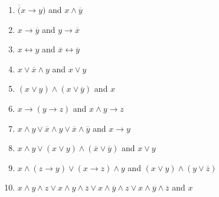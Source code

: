     \begin{enumerate}
        \item $\overline (x \rightarrow y)$ and $x \wedge \overline y$
        \item $x \rightarrow \overline y$ and $y \rightarrow \overline x$
        \item $x \leftrightarrow y$ and $\overline x \leftrightarrow \overline y$
        \item $x \vee \overline x \wedge y$ and $x \vee y$
        \item $(x \vee y) \wedge (x \vee \overline y)$ and $x$
        \item $x \rightarrow (y \rightarrow z)$ and $x \wedge y \rightarrow z$
        \item $x \wedge y \vee \overline x \wedge y \vee \overline x \wedge \overline y$ and $x \rightarrow y$
        \item $x \wedge y \vee (x \vee y) \wedge (\overline x \vee \overline y)$ and $x \vee y$
        \item $x \wedge (z \rightarrow y) \vee (x \rightarrow z) \wedge y$ and $(x \vee y) \wedge (y \vee \overline z)$
        \item $x \wedge y \wedge z \vee x \wedge y \wedge \overline z \vee x \wedge \overline y \wedge z \vee x \wedge \overline y \wedge \overline z$ and $x$
    \end{enumerate}

